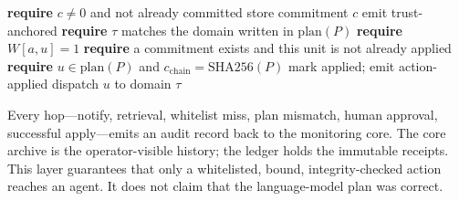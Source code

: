 \begin{algorithm}[t]
\caption{Commit and Apply}
\label{alg:commit-apply}
\begin{algorithmic}[1]
    \STATE \textbf{require} $c \neq 0$ and not already committed
    \STATE store commitment $c$
    \STATE emit trust-anchored
\ENDPROCEDURE
{}
    \STATE \textbf{require} $\tau$ matches the domain written in $\mathrm{plan}(P)$
    \STATE \textbf{require} $W[a,u]=1$ 
    \STATE \textbf{require} a commitment exists and this unit is not already applied
    \STATE \textbf{require} $u \in \mathrm{plan}(P)$ and $c_{\mathrm{chain}}=\mathrm{SHA256}(P)$
    \STATE mark applied; emit action-applied
    \STATE dispatch $u$ to domain $\tau$
\ENDPROCEDURE
\end{algorithmic}
\end{algorithm}

Every hop---notify, retrieval, whitelist miss, plan mismatch, human approval, successful apply---emits an audit record back to the monitoring core. The core archive is the operator-visible history; the ledger holds the immutable receipts. This layer guarantees that only a whitelisted, bound, integrity-checked action reaches an agent. It does not claim that the language-model plan was correct.
